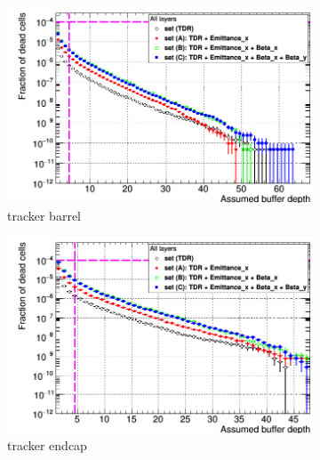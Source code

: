 \begin{figure}
 \centering
   \begin{subfigure}[b]{0.49\textwidth}
   \centering
    \includegraphics[width=\textwidth]{Figures/Pairs/Appendix/Occupancy_Comparison_All_layers_deadcells_ILC250_ALL_SETS_SiTrackerBarrel_corrected_Barrel_size.png}
   \caption{\sid tracker barrel}
   \end{subfigure}
   \hfill
    \begin{subfigure}[b]{0.49\textwidth}
   \centering
    \includegraphics[width=\textwidth]{Figures/Pairs/Appendix/Occupancy_Comparison_All_layers_deadcells_ILC250_ALL_SETS_SiTrackerEndcap.png}
   \caption{\sid tracker endcap}
   \end{subfigure}\\
    \begin{subfigure}[b]{0.49\textwidth}
   \centering

\end{subfigure}
\end{figure}
